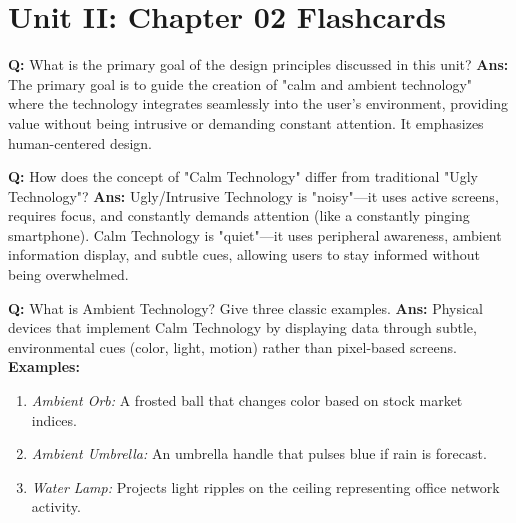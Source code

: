 \documentclass[10pt,a4paper,twocolumn]{article}
\begin{document}
\section*{Unit II: Chapter 02 Flashcards}

\begin{tcolorbox}[
  colback=white,
  colframe=UnitColorTwo,
  colbacktitle=gray!10!white,
  coltitle=black,
  fonttitle=\bfseries\sffamily\small,
  title={Unit II $\bullet$ Card 1},
  boxrule=1.2pt,
  arc=2mm,
  outer arc=2mm,
  boxsep=1.5mm,
  top=1mm,
  bottom=1mm,
  left=1.5mm,
  right=1.5mm,
  before skip=2.5mm,
  after skip=2.5mm
]
\textbf{Q:} What is the primary goal of the design principles discussed in this unit?
\tcbline
\textbf{Ans:} The primary goal is to guide the creation of "calm and ambient technology" where the technology integrates seamlessly into the user's environment, providing value without being intrusive or demanding constant attention. It emphasizes human-centered design.
\end{tcolorbox}


\begin{tcolorbox}[
  colback=white,
  colframe=UnitColorTwo,
  colbacktitle=gray!10!white,
  coltitle=black,
  fonttitle=\bfseries\sffamily\small,
  title={Unit II $\bullet$ Card 2},
  boxrule=1.2pt,
  arc=2mm,
  outer arc=2mm,
  boxsep=1.5mm,
  top=1mm,
  bottom=1mm,
  left=1.5mm,
  right=1.5mm,
  before skip=2.5mm,
  after skip=2.5mm
]
\textbf{Q:} How does the concept of "Calm Technology" differ from traditional "Ugly Technology"?
\tcbline
\textbf{Ans:} Ugly/Intrusive Technology is "noisy"—it uses active screens, requires focus, and constantly demands attention (like a constantly pinging smartphone). Calm Technology is "quiet"—it uses peripheral awareness, ambient information display, and subtle cues, allowing users to stay informed without being overwhelmed.
\end{tcolorbox}


\begin{tcolorbox}[
  colback=white,
  colframe=UnitColorTwo,
  colbacktitle=gray!10!white,
  coltitle=black,
  fonttitle=\bfseries\sffamily\small,
  title={Unit II $\bullet$ Card 3},
  boxrule=1.2pt,
  arc=2mm,
  outer arc=2mm,
  boxsep=1.5mm,
  top=1mm,
  bottom=1mm,
  left=1.5mm,
  right=1.5mm,
  before skip=2.5mm,
  after skip=2.5mm
]
\textbf{Q:} What is Ambient Technology? Give three classic examples.
\tcbline
\textbf{Ans:} Physical devices that implement Calm Technology by displaying data through subtle, environmental cues (color, light, motion) rather than pixel-based screens.  
\textbf{Examples:}  
\begin{enumerate}
  \item \textit{Ambient Orb:} A frosted ball that changes color based on stock market indices.
  \item \textit{Ambient Umbrella:} An umbrella handle that pulses blue if rain is forecast.
  \item \textit{Water Lamp:} Projects light ripples on the ceiling representing office network activity.
\end{enumerate}
\end{tcolorbox}
\end{document}
